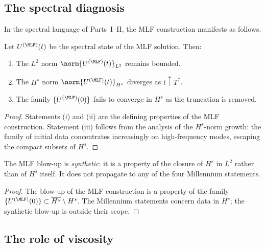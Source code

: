 \subsection{The spectral diagnosis}
\label{part-3:ssec:MLF-spectral}

In the spectral language of Parts~I--II, the MLF construction 
manifests as follows.

\begin{proposition}\label{part-3:prop:MLF-spectral}
Let $U^{(\MLF)}(t)$ be the spectral state of the MLF solution. Then:
\begin{enumerate}[label=(\roman*),leftmargin=*]
\item The $L^2$ norm $\norm{U^{(\MLF)}(t)}_{L^2}$ remains bounded.
\item The $H^s$ norm $\norm{U^{(\MLF)}(t)}_{H^s}$ diverges as 
      $t\uparrow T^\ast$.
\item The family $\{U^{(\MLF)}(0)\}$ fails to converge in $H^s$ as 
      the truncation is removed.
\end{enumerate}
\end{proposition}

\begin{proof}
Statements (i) and (ii) are the defining properties of the MLF 
construction. Statement (iii) follows from the analysis of the 
$H^s$-norm growth: the family of initial data concentrates 
increasingly on high-frequency modes, escaping the compact subsets 
of $H^s$.
\end{proof}

\begin{corollary}\label{part-3:cor:MLF-synthetic}
The MLF blow-up is \emph{synthetic}: it is a property of the closure 
of $H^s$ in $L^2$ rather than of $H^s$ itself. It does not propagate 
to any of the four Millennium statements.
\end{corollary}

\begin{proof}
The blow-up of the MLF construction is a property of the family 
$\{U^{(\MLF)}(0)\}\subset \overline{H^s}\setminus H^s$. The 
Millennium statements concern data in $H^s$; the synthetic blow-up 
is outside their scope.
\end{proof}

\subsection{The role of viscosity}
\label{part-3:ssec:MLF-viscosity}

